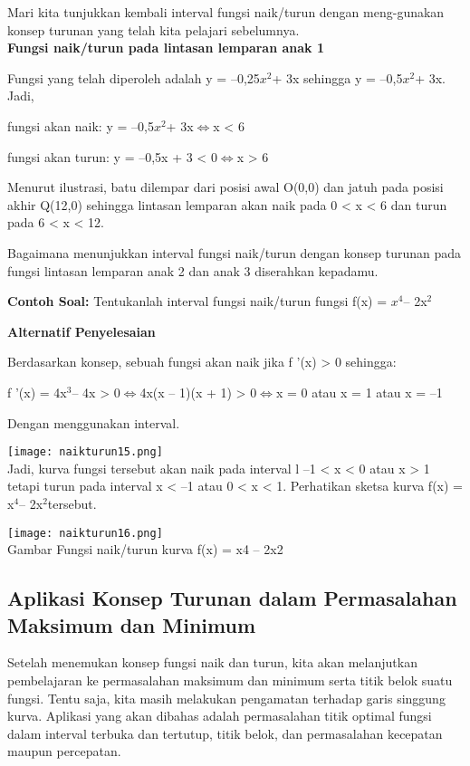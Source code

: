 \documentclass[11pt,fleqn]{book} %
\begin{document}
Mari kita tunjukkan kembali interval fungsi naik/turun dengan meng-gunakan konsep turunan yang telah kita pelajari sebelumnya.\\

\textbf{Fungsi naik/turun pada lintasan lemparan anak 1}

Fungsi yang telah diperoleh adalah y = –0,25$x^{2} $+ 3x sehingga y = –0,5$x^{2} $+ 3x. Jadi,

fungsi akan naik: y = –0,5$x^{2} $+ 3x$ \Leftrightarrow $x < 6

fungsi akan turun: y = –0,5x + 3 < 0$ \Leftrightarrow $x > 6

Menurut ilustrasi, batu dilempar dari posisi awal O(0,0) dan jatuh pada posisi akhir Q(12,0) sehingga lintasan lemparan akan naik pada 0 < x < 6 dan turun pada 6 < x < 12.

Bagaimana menunjukkan interval fungsi naik/turun
dengan konsep turunan pada fungsi lintasan lemparan
anak 2 dan anak 3 diserahkan kepadamu.

\textbf {Contoh Soal:} 
Tentukanlah interval fungsi naik/turun fungsi f(x) = $x^{4} $– 2x$^{2}$

\textbf{Alternatif Penyelesaian}

Berdasarkan konsep, sebuah fungsi akan naik jika f '(x) > 0 sehingga:

f '(x) = 4x$^{3} $– 4x > 0$ \Leftrightarrow $4x(x – 1)(x + 1) > 0$ \Leftrightarrow $x = 0 atau x = 1 atau x = –1

Dengan menggunakan interval.

\texttt{[image: naikturun15.png]}\\

Jadi, kurva fungsi tersebut akan naik pada interval l –1 < x < 0 atau x > 1 tetapi turun pada interval x < –1 atau 0 < x < 1. Perhatikan sketsa kurva f(x) = x$^{4} $– 2x$^{2} $tersebut.\\

\begin{center}
\texttt{[image: naikturun16.png]}\\
Gambar Fungsi naik/turun kurva f(x) = x4 – 2x2
\end{center}

\subsection{Aplikasi Konsep Turunan dalam
Permasalahan Maksimum dan Minimum}

Setelah menemukan konsep fungsi naik dan turun,
kita akan melanjutkan pembelajaran ke permasalahan
maksimum dan minimum serta titik belok suatu fungsi.
Tentu saja, kita masih melakukan pengamatan terhadap
garis singgung kurva. Aplikasi yang akan dibahas adalah permasalahan titik optimal fungsi dalam interval terbuka dan tertutup, titik belok, dan permasalahan kecepatan maupun percepatan.\\
\end{document}

